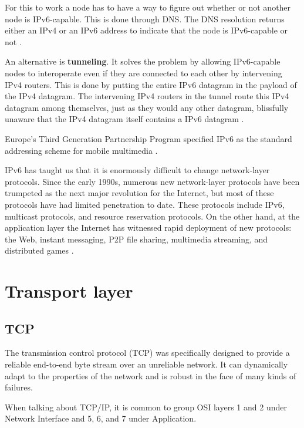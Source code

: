 For this to work a node has to have a way to figure out whether or not another node is IPv6-capable. This is done through DNS. The DNS resolution returns either an IPv4 or an IPv6 address to indicate that the node is IPv6-capable or not \cite[p.~360]{computer-networking-kurose-2012}.

An alternative is \textbf{tunneling}. It solves the problem by allowing IPv6-capable nodes to interoperate even if they are connected to each other by intervening IPv4 routers. This is done by putting the entire IPv6 datagram in the payload of the IPv4 datagram. The intervening IPv4 routers in the tunnel route this IPv4 datagram among themselves, just as they would any other datagram, blissfully unaware that the IPv4 datagram itself contains a IPv6 datagram \cite[p.~360]{computer-networking-kurose-2012}.

Europe's Third Generation Partnership Program specified IPv6 as the standard addressing scheme for mobile multimedia \cite[p.~362]{computer-networking-kurose-2012}.

IPv6 has taught us that it is enormously difficult to change network-layer protocols. Since the early 1990s, numerous new network-layer protocols have been trumpeted as the next major revolution for the
Internet, but most of these protocols have had limited penetration to date.
These protocols include IPv6, multicast protocols, and resource reservation protocols.
On the other hand, at the application layer the Internet has witnessed rapid deployment of new protocols: the Web, instant messaging, P2P file sharing, multimedia streaming, and distributed games \cite[p.~362]{computer-networking-kurose-2012}.

\section{Transport layer}

\subsection{TCP}

The transmission control protocol (TCP) was specifically designed to provide a reliable end-to-end byte stream over an unreliable network.
It can dynamically adapt to the properties of the network and is robust in the face of many kinds of failures.

When talking about TCP/IP, it is common to group OSI layers 1 and 2 under Network Interface and 5, 6, and 7 under Application.

